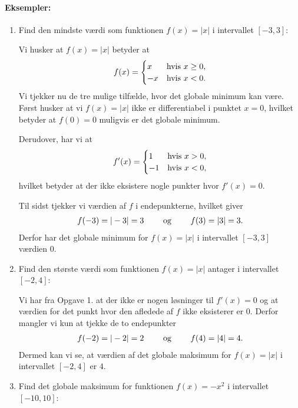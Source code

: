 \paragraph*{Eksempler:}
\begin{enumerate}
\item Find den mindste værdi som funktionen $f(x)=\vert x \vert$ i intervallet $[-3,3]$:

Vi husker at $f(x)=\vert x \vert$ betyder at
\begin{align*}
f(x) = \begin{cases}
x & \textup{hvis } x \geq 0,\\
-x & \textup{hvis } x < 0.
\end{cases}
\end{align*}
Vi tjekker nu de tre mulige tilfælde, hvor det globale minimum kan være. Først husker at vi $f(x)=\vert x \vert$ ikke er differentiabel i punktet $x=0$, hvilket betyder at $f(0)=0$ muligvis er det globale minimum.

Derudover, har vi at 
\begin{align*}
f'(x)= \begin{cases}
1 & \textup{hvis } x > 0, \\
-1 & \textup{hvis } x < 0,
\end{cases}
\end{align*}
hvilket betyder at der ikke eksistere nogle punkter hvor $f'(x)=0$.

Til sidst tjekker vi værdien af $f$ i endepunkterne, hvilket giver
\begin{align*}
f(-3)=\vert -3 \vert = 3 \qquad \textup{ og } \qquad f(3)=\vert 3 \vert = 3.
\end{align*}
Derfor har det globale minimum for $f(x)=\vert x \vert$ i intervallet $[-3,3]$ værdien $0$.
\item Find den største værdi som funktionen $f(x)=\vert x \vert$ antager i intervallet $[-2,4]$:

Vi har fra Opgave 1. at der ikke er nogen løsninger til $f'(x)=0$ og at værdien for det punkt hvor den afledede af $f$ ikke eksisterer er $0$. Derfor mangler vi kun at tjekke de to endepunkter
\begin{align*}
f(-2) = \vert -2 \vert = 2 \qquad \textup{ og } \qquad f(4) = \vert 4 \vert =4.
\end{align*}
Dermed kan vi se, at værdien af det globale maksimum for $f(x)=\vert x \vert$ i intervallet $[-2,4]$ er $4$.
\item Find det globale maksimum for funktionen $f(x)=-x^2$ i intervallet $[-10,10]$:


\end{enumerate}

